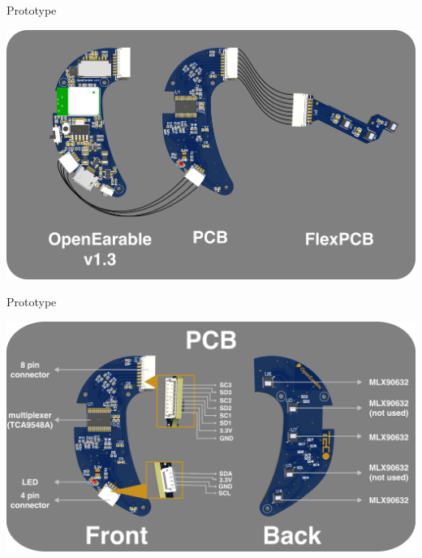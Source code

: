 \documentclass[en]{sdqbeamer}
\begin{document}
\begin{frame}{Prototype}
    \begin{center}
        \includegraphics[width=0.6\linewidth]{../thesis-doc/images/prototype/PrototypeConnection.png} %
    \end{center}
\end{frame}

\begin{frame}{Prototype}
    \begin{center}
        \includegraphics[width=0.6\linewidth]{../thesis-doc/images/prototype/PCB_Description.png} %
    \end{center}
\end{frame}
\end{document}
